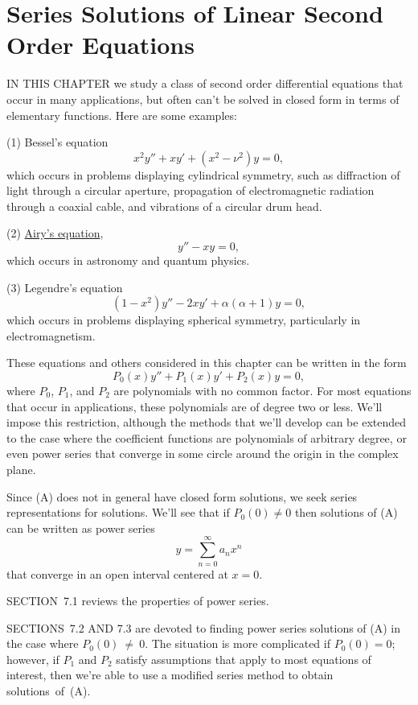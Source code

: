 \chapter{Series Solutions of Linear Second Order Equations}

\noindent
IN THIS CHAPTER we study a class of second order differential equations that occur in many
applications, but often can't be solved in closed form in terms of elementary functions. Here are some
examples:

\medskip
\noindent
(1) Bessel's equation
\[
  x^{2}y''+xy'+(x^{2}-\nu^{2})y=0,
\]
which occurs in problems displaying cylindrical symmetry, such as diffraction of light through a
circular aperture, propagation of electromagnetic radiation through a coaxial cable, and vibrations
of a circular drum head.

\medskip
\noindent
(2) \href{https://mathshistory.st-andrews.ac.uk/Biographies/Airy/}{\color{blue}
Airy's equation},
\[
  y''-xy=0,
\]
which occurs in astronomy and quantum physics.

\medskip
\noindent
(3) Legendre's equation
\[
  (1-x^{2})y''-2xy'+\alpha(\alpha+1)y=0,
\]
which occurs in problems displaying spherical symmetry, particularly in electromagnetism.

\noindent
These equations and others considered in this chapter can be written in the form
\begin{equation}
  P_{0}(x)y''+P_{1}(x)y'+P_{2}(x)y=0,\tag{A}
\end{equation}
where $P_{0}$, $P_{1}$, and $P_{2}$ are polynomials with no common factor. For most equations that
occur in applications, these polynomials are of degree two or less. We'll impose this restriction,
although the methods that we'll develop can be extended to the case where the coefficient functions
are polynomials of arbitrary degree, or even power series that converge in some circle around the
origin in the complex plane.

Since (A) does not in general have closed form solutions, we seek series representations for
solutions. We'll see that if $P_{0}(0)\ne0$ then solutions of (A) can be written as power series
\[
  y=\sum_{n=0}^{\infty}a_{n}x^{n}
\]
that converge in an open interval centered at $x=0$.

\medskip
\noindent
SECTION~7.1 reviews the properties of power series.

\medskip
\noindent
SECTIONS~7.2 AND 7.3 are devoted to finding power series solutions of (A) in the case where
$P_{0}(0)~\ne~0$. The situation is more complicated if $P_{0}(0)=0$; however, if $P_{1}$ and $P_{2}$
satisfy assumptions that apply to most equations of interest, then we're able to use a modified
series method to obtain solutions~of~(A).

